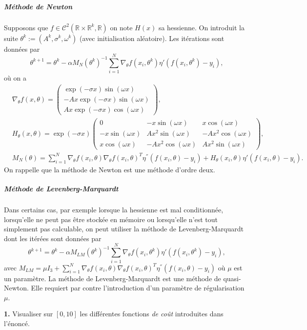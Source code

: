 \documentclass[a4paper,french,12pt]{article}
\begin{document}
\subparagraph{Méthode de Newton} Supposons que $f \in \mathcal{C}^2(\mathbb{R} \times \mathbb{R}^k, \mathbb{R})$ on note $H(x)$ sa hessienne. On introduit la suite $\theta^k := (A^k, \sigma^k, \omega^k)$ (avec initialisation aléatoire). Les itérations sont données par
\[
  \theta^{k+1} = \theta^k - \alpha M_N(\theta^k)^{-1} \sum_{i=1}^N \nabla_{\theta} f(x_i,\theta^k) \eta'(f(x_i,\theta^k) - y_i),
\]
où on a
\[
  \begin{aligned}
    & \nabla_{\theta} f(x,\theta) = \left( \begin{matrix} \exp(-\sigma x) \sin(\omega x) \\ -Ax \exp(-\sigma x) \sin(\omega x) \\ Ax \exp(-\sigma x) \cos(\omega x) \end{matrix} \right),\\
    & H_{\theta}(x,\theta) = \exp(-\sigma x) \left( \begin{matrix}0 & -x\sin(\omega x) & x\cos(\omega x) \\ -x\sin(\omega x) & Ax^2 \sin(\omega x) & -Ax^2\cos(\omega x) \\ x \cos(\omega x) & -Ax^2 \cos(\omega x) & Ax^2 \sin(\omega x) \end{matrix} \right),\\
    & M_N(\theta) = \sum_{i = 1}^{N} \nabla_{\theta}f(x_i,\theta) \nabla_{\theta}f(x_i,\theta)^T \eta^{''}(f(x_i,\theta) - y_i) + H_{\theta}(x_i,\theta) \eta'(f(x_i,\theta) - y_i).
  \end{aligned}
\]
On rappelle que la méthode de Newton est une méthode d'ordre deux.
\subparagraph{Méthode de Levenberg-Marquardt} Dans certains cas, par exemple lorsque la hessienne est mal conditionnée, lorsqu'elle ne peut pas être stockée en mémoire ou lorsqu'elle n'est tout simplement pas calculable, on peut utiliser la méthode de Levenberg-Marquardt dont les itérées sont données par
\[
  \theta^{k+1} = \theta^k - \alpha M_{LM}(\theta^k)^{-1} \sum_{i=1}^N \nabla_{\theta} f(x_i,\theta^k) \eta'(f(x_i,\theta^k) - y_i),
\]
avec $M_{LM} = \mu I_3 + \sum_{i = 1}^{N} \nabla_{\theta}f(x_i,\theta) \nabla_{\theta}f(x_i,\theta)^T \eta^{''}(f(x_i,\theta) - y_i)$ où $\mu$ est un paramètre. La méthode de Levenberg-Marquardt est une méthode de quasi-Newton. Elle requiert par contre l'introduction d'un paramètre de régularisation $\mu$.

\textbf{1.} Visualiser sur $[0,10]$ les différentes fonctions \textit{de coût} introduites dans l'énoncé.
\end{document}
